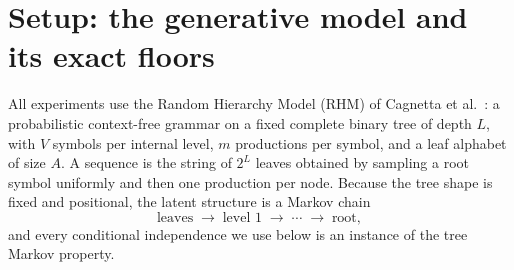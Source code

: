 \documentclass[11pt,a4paper]{article}
\theoremstyle{plain}
\theoremstyle{definition}
\begin{document}
%
%      

%
%      

\section{Setup: the generative model and its exact floors}
\label{sec:hier-setup}

All experiments use the Random Hierarchy Model (RHM) of
Cagnetta et al.~\cite{cagnetta2024}: a probabilistic context-free grammar on a
fixed complete binary tree of depth $L$, with $V$ symbols per internal level,
$m$ productions per symbol, and a leaf alphabet of size $A$. A sequence is the
string of $2^L$ leaves obtained by sampling a root symbol uniformly and then
one production per node. Because the tree shape is fixed and positional, the
latent structure is a Markov chain
\begin{equation}
  \text{leaves} \;\to\; \text{level }1 \;\to\; \cdots \;\to\; \text{root},
  \label{eq:markov}
\end{equation}
and every conditional independence we use below is an instance of the tree
Markov property.
\end{document}

